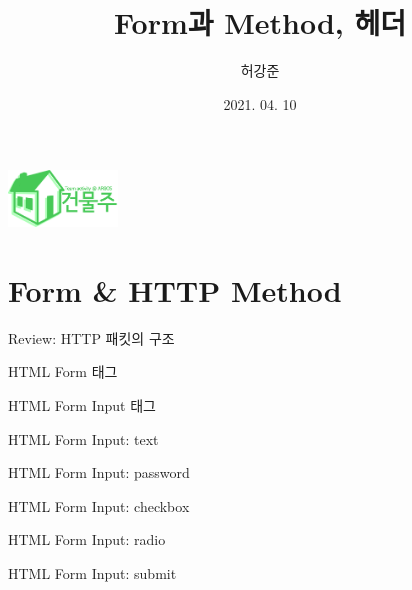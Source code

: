 \documentclass{beamer}
\title{Form과 Method, 헤더}
\author{허강준}
\institute{충남대학교 정보보호동아리 ARGOS}
\date{2021. 04. 10}
\begin{document}
\begin{frame}
    \begin{center}
        \includegraphics[height=1.5cm]{../Images/logo.png}
    \end{center}

    \maketitle
\end{frame}

\section{Form & HTTP Method}
    \begin{frame}{Review: HTTP 패킷의 구조}

    \end{frame}

    \begin{frame}{HTML Form 태그}

    \end{frame}

    \begin{frame}{HTML Form Input 태그}

    \end{frame}

    \begin{frame}{HTML Form Input: text}

    \end{frame}

    \begin{frame}{HTML Form Input: password}

    \end{frame}

    \begin{frame}{HTML Form Input: checkbox}

    \end{frame}

    \begin{frame}{HTML Form Input: radio}

    \end{frame}

    \begin{frame}{HTML Form Input: submit}

    \end{frame}
\end{document}
